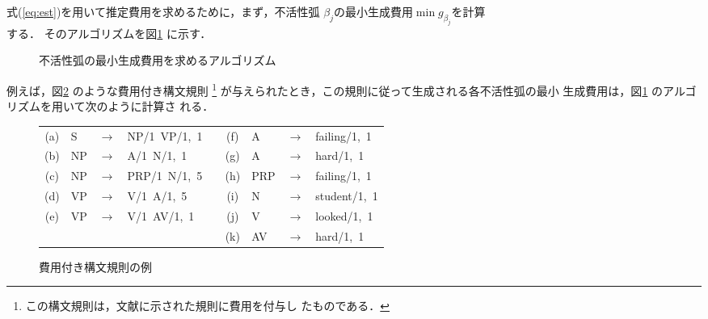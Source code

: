 式(\ref{eq:est})を用いて推定費用を求めるために，まず，不活性弧
$\beta_j$の最小生成費用$\min g_{\beta_j}$を計算\\する．
そのアルゴリズムを図\ref{fig:min_cost} に示す．
\begin{figure}
\samepage
\begin{center}
\end{center}
\caption{不活性弧の最小生成費用を求めるアルゴリズム}
\label{fig:min_cost}
\end{figure}
例えば，図\ref{fig:rule} のような費用付き構文規則
\footnote{この構文規則は，文献\cite{Kay80}に示された規則に費用を付与し
たものである．}
が与えられたとき，この規則に従って生成される各不活性弧の最小
生成費用は，図\ref{fig:min_cost} のアルゴリズムを用いて次のように計算さ
れる．
\begin{figure}
\begin{center}
\small{
\begin{tabular}{clclcclcl}
(a)&S &$\rightarrow$&NP/1\ VP/1,\ 1&&(f)&A  &$\rightarrow$&failing/1,\ 1\\
(b)&NP&$\rightarrow$&A/1\ N/1,\ 1  &&(g)&A  &$\rightarrow$&hard/1,\ 1   \\
(c)&NP&$\rightarrow$&PRP/1\ N/1,\ 5&&(h)&PRP&$\rightarrow$&failing/1,\ 1\\
(d)&VP&$\rightarrow$&V/1\ A/1,\ 5  &&(i)&N  &$\rightarrow$&student/1,\ 1\\
(e)&VP&$\rightarrow$&V/1\ AV/1,\ 1 &&(j)&V  &$\rightarrow$&looked/1,\ 1 \\
&  &             &              &&(k)&AV &$\rightarrow$&hard/1,\ 1
\end{tabular}
}
\end{center}
\caption{費用付き構文規則の例}
\label{fig:rule}
\end{figure}
